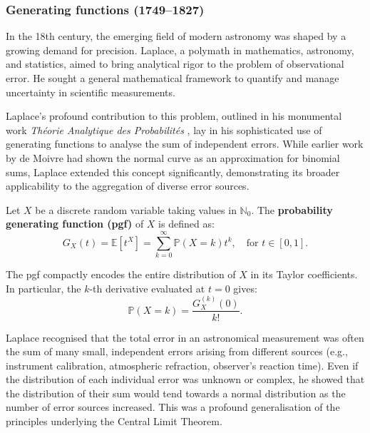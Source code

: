\vspace{-0.5em}

\subsubsection{Generating functions (1749--1827)}
In the 18th century, the emerging field of modern astronomy was shaped by a growing demand for precision. Laplace, a polymath in mathematics, astronomy, and statistics, aimed to bring analytical rigor to the problem of observational error. He sought a general mathematical framework to quantify and manage uncertainty in scientific measurements.

Laplace's profound contribution to this problem, outlined in his monumental work \emph{Théorie Analytique des Probabilités} \cite{laplace1812theorie}, lay in his sophisticated use of generating functions to analyse the sum of independent errors. While earlier work by de Moivre had shown the normal curve as an approximation for binomial sums, Laplace extended this concept significantly, demonstrating its broader applicability to the aggregation of diverse error sources.

\begin{definition}
Let \( X \) be a discrete random variable taking values in \( \mathbb{N}_0 \). The \textbf{probability generating function (pgf)} of \( X \) is defined as:
\[
G_X(t) = \mathbb{E}[t^X] = \sum_{k=0}^\infty \mathbb{P}(X = k)t^k, \quad \text{for } t \in [0,1].
\]
\end{definition}

The pgf compactly encodes the entire distribution of \( X \) in its Taylor coefficients. In particular, the \( k \)-th derivative evaluated at \( t = 0 \) gives:
\[
\mathbb{P}(X = k) = \frac{G_X^{(k)}(0)}{k!}.
\]


\vspace{-0.5em}

Laplace recognised that the total error in an astronomical measurement was often the sum of many small, independent errors arising from different sources (e.g., instrument calibration, atmospheric refraction, observer's reaction time). Even if the distribution of each individual error was unknown or complex, he showed that the distribution of their sum would tend towards a normal distribution as the number of error sources increased. This was a profound generalisation of the principles underlying the Central Limit Theorem.

